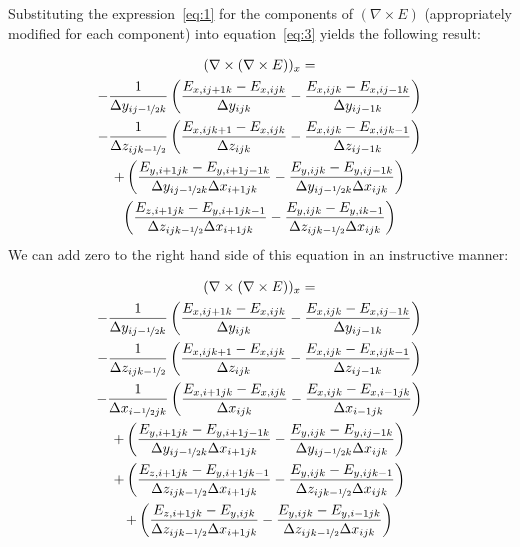 \documentclass{article}
\newcommand{\Fijk}[5]{{#1}_{{#2},{#3}{#4}{#5}}}
\newcommand{\curl}[1]{\nabla \times {#1}}
\newcommand{\dxijk}[3]{\Delta x _{{#1}{#2}{#3}}}
\newcommand{\dyijk}[3]{\Delta y _{{#1}{#2}{#3}}}
\newcommand{\dzijk}[3]{\Delta z _{{#1}{#2}{#3}}}
\newcommand{\dxdual}{\Delta x_{i-\nicefrac{1}{2}jk}}
\newcommand{\dydual}{\Delta y_{ij-\nicefrac{1}{2}k}}
\newcommand{\dzdual}{\Delta z_{ijk-\nicefrac{1}{2}}}
\newcommand{\delxe}{(\curl{E})}
\begin{document}
Substituting the expression~\ref{eq:1} for the components of $\delxe$
(appropriately modified for each component) into equation~\ref{eq:3}
yields the following result:

\begin{multline}
  \label{eq:4}
  (\curl{ \delxe})_x = \\
  - \frac{1}{\dydual}
  \left( \frac{  \Fijk{E}{x}{i}{j+1}{k}  - \Fijk{E}{x}{i}{j}{k}}
    {\dyijk{i}{j}{k}}
    - \frac{  \Fijk{E}{x}{i}{j}{k}  - \Fijk{E}{x}{i}{j-1}{k}}
    {\dyijk{i}{j-1}{k}} \right) \\
  - \frac{1}{\dzdual}
  \left( \frac{  \Fijk{E}{x}{i}{j}{k+1}  - \Fijk{E}{x}{i}{j}{k}}
    {\dzijk{i}{j}{k}}
    - \frac{  \Fijk{E}{x}{i}{j}{k}  - \Fijk{E}{x}{i}{j}{k-1}}
    {\dzijk{i}{j-1}{k}} \right) \\
  +
  \left( \frac{\Fijk{E}{y}{i+1}{j}{k} - \Fijk{E}{y}{i+1}{j-1}{k}}
    {\dydual \dxijk{i+1}{j}{k}}
    - \frac{\Fijk{E}{y}{i}{j}{k} - \Fijk{E}{y}{i}{j-1}{k}}
    {\dydual \dxijk{i}{j}{k}} \right) \\
  \left( \frac{\Fijk{E}{z}{i+1}{j}{k} - \Fijk{E}{y}{i+1}{j}{k-1}}
    {\dzdual \dxijk{i+1}{j}{k}}
    - \frac{\Fijk{E}{y}{i}{j}{k} - \Fijk{E}{y}{i}{}{k-1}}
    {\dzdual \dxijk{i}{j}{k}} \right)
\end{multline}
We can add zero to the right hand side of this equation in an
instructive manner:

\begin{multline}
  \label{eq:5}
  (\curl{ \delxe})_x = \\
  - \frac{1}{\dydual}
  \left( \frac{  \Fijk{E}{x}{i}{j+1}{k}  - \Fijk{E}{x}{i}{j}{k}}
    {\dyijk{i}{j}{k}}
    - \frac{  \Fijk{E}{x}{i}{j}{k}  - \Fijk{E}{x}{i}{j-1}{k}}
    {\dyijk{i}{j-1}{k}} \right) \\
  - \frac{1}{\dzdual}
  \left( \frac{  \Fijk{E}{x}{i}{j}{k+1}  - \Fijk{E}{x}{i}{j}{k}}
    {\dzijk{i}{j}{k}}
    - \frac{  \Fijk{E}{x}{i}{j}{k}  - \Fijk{E}{x}{i}{j}{k-1}}
    {\dzijk{i}{j-1}{k}} \right) \\
  - \frac{1}{\dxdual}
  \left( \frac{  \Fijk{E}{x}{i+1}{j}{k}  - \Fijk{E}{x}{i}{j}{k}}
    {\dxijk{i}{j}{k}}
    - \frac{  \Fijk{E}{x}{i}{j}{k}  - \Fijk{E}{x}{i-1}{j}{k}}
    {\dxijk{i-1}{j}{k}} \right) \\
  +
  \left( \frac{\Fijk{E}{y}{i+1}{j}{k} - \Fijk{E}{y}{i+1}{j-1}{k}}
    {\dydual \dxijk{i+1}{j}{k}}
    - \frac{\Fijk{E}{y}{i}{j}{k} - \Fijk{E}{y}{i}{j-1}{k}}
    {\dydual \dxijk{i}{j}{k}} \right) \\
  + \left( \frac{\Fijk{E}{z}{i+1}{j}{k} - \Fijk{E}{y}{i+1}{j}{k-1}}
    {\dzdual \dxijk{i+1}{j}{k}}
    - \frac{\Fijk{E}{y}{i}{j}{k} - \Fijk{E}{y}{i}{j}{k-1}}
    {\dzdual \dxijk{i}{j}{k}} \right) \\
  + \left( \frac{\Fijk{E}{z}{i+1}{j}{k} - \Fijk{E}{y}{i}{j}{k}}
    {\dzdual \dxijk{i+1}{j}{k}}
    - \frac{\Fijk{E}{y}{i}{j}{k} - \Fijk{E}{y}{i-1}{j}{k}}
    {\dzdual \dxijk{i}{j}{k}} \right)
\end{multline}
\end{document}
